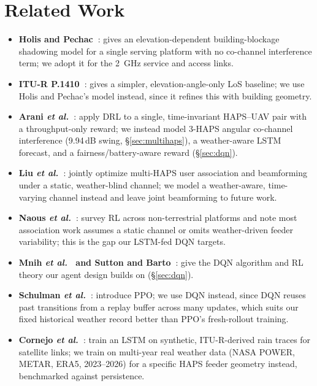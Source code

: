 \documentclass[]{ieeeaccess}
\begin{document}
\section{Related Work}
\label{sec:related-work}

\begin{itemize}\setlength{\itemsep}{2pt}
  \item \textbf{Holis and Pechac~\cite{holispechac2008}}: gives an elevation-dependent building-blockage shadowing model for a single serving platform with no co-channel interference term; we adopt it for the 2~GHz service and access links.
  \item \textbf{ITU-R P.1410~\cite{itu_p1410}}: gives a simpler, elevation-angle-only LoS baseline; we use Holis and Pechac's model instead, since it refines this with building geometry.
  \item \textbf{Arani \emph{et al.}~\cite{arani2023}}: apply DRL to a single, time-invariant HAPS--UAV pair with a throughput-only reward; we instead model 3-HAPS angular co-channel interference (9.94\,dB swing, \S\ref{sec:multihaps}), a weather-aware LSTM forecast, and a fairness/battery-aware reward (\S\ref{sec:dqn}).
  \item \textbf{Liu \emph{et al.}~\cite{liu2026multihaps}}: jointly optimize multi-HAPS user association and beamforming under a static, weather-blind channel; we model a weather-aware, time-varying channel instead and leave joint beamforming to future work.
  \item \textbf{Naous \emph{et al.}~\cite{naous2023rlsky}}: survey RL across non-terrestrial platforms and note most association work assumes a static channel or omits weather-driven feeder variability; this is the gap our LSTM-fed DQN targets.
  \item \textbf{Mnih \emph{et al.}~\cite{mnih2015dqn} and Sutton and Barto~\cite{sutton2018rl}}: give the DQN algorithm and RL theory our agent design builds on (\S\ref{sec:dqn}).
  \item \textbf{Schulman \emph{et al.}~\cite{schulman2017ppo}}: introduce PPO; we use DQN instead, since DQN reuses past transitions from a replay buffer across many updates, which suits our fixed historical weather record better than PPO's fresh-rollout training.
  \item \textbf{Cornejo \emph{et al.}~\cite{cornejo2022lstmrain}}: train an LSTM on synthetic, ITU-R-derived rain traces for satellite links; we train on multi-year real weather data (NASA POWER, METAR, ERA5, 2023--2026) for a specific HAPS feeder geometry instead, benchmarked against persistence.

\end{itemize}
\end{document}
